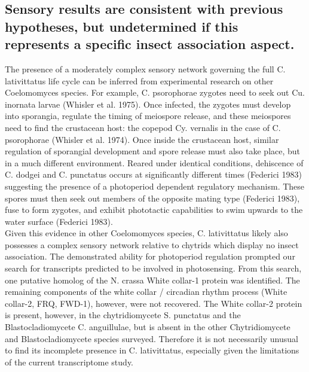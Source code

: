 \subsection*{Sensory results are consistent with previous hypotheses, but undetermined if this represents a specific insect association aspect.}
The presence of a moderately complex sensory network governing the full C. lativittatus life cycle can be inferred from experimental research on other Coelomomyces species. For example, C. psorophorae zygotes need to seek out Cu. inornata larvae (Whisler et al. 1975). Once infected, the zygotes must develop into sporangia, regulate the timing of meiospore release, and these meiospores need to find the crustacean host: the copepod Cy. vernalis in the case of C. psorophorae (Whisler et al. 1974). Once inside the crustacean host, similar regulation of sporangial development and spore release must also take place, but in a much different environment. Reared under identical conditions, dehiscence of C. dodgei and C. punctatus occurs at significantly different times (Federici 1983) suggesting the presence of a photoperiod dependent regulatory mechanism. These spores must then seek out members of the opposite mating type (Federici 1983), fuse to form zygotes, and exhibit phototactic capabilities to swim upwards to the water surface (Federici 1983). \\
\indent Given this evidence in other Coelomomyces species, C. lativittatus likely also possesses a complex sensory network relative to chytrids which display no insect association. The demonstrated ability for photoperiod regulation prompted our search for transcripts predicted to be involved in photosensing. From this search, one putative homolog of the N. crassa White collar-1 protein was identified. The remaining components of the white collar / circadian rhythm process (White collar-2, FRQ, FWD-1), however, were not recovered. The White collar-2 protein is present, however, in the chytridiomycete S. punctatus and the Blastocladiomycete C. anguillulae, but is absent in the other Chytridiomycete and Blastocladiomycete species surveyed. Therefore it is not necessarily unusual to find its incomplete presence in C. lativittatus, especially given the limitations of the current transcriptome study. \\
